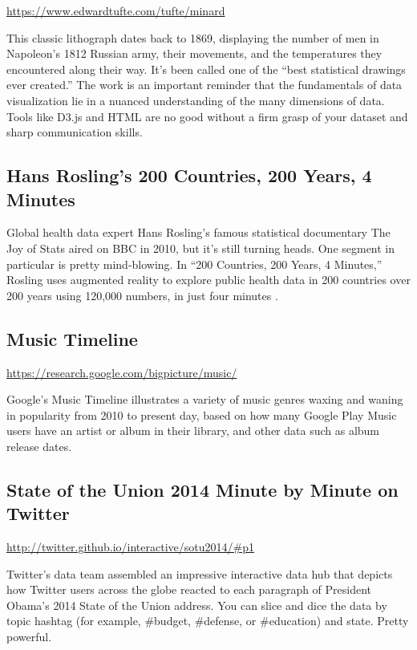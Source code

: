 \documentclass[]{book}
\theoremstyle{definition}
\theoremstyle{definition}
\theoremstyle{definition}
\theoremstyle{remark}
\begin{document}
\url{https://www.edwardtufte.com/tufte/minard}

This classic lithograph dates back to 1869, displaying the number of men
in Napoleon's 1812 Russian army, their movements, and the temperatures
they encountered along their way. It's been called one of the ``best
statistical drawings ever created.'' The work is an important reminder
that the fundamentals of data visualization lie in a nuanced
understanding of the many dimensions of data. Tools like D3.js and HTML
are no good without a firm grasp of your dataset and sharp communication
skills.

\subsection{Hans Rosling's 200 Countries, 200 Years, 4
Minutes}\label{hans-roslings-200-countries-200-years-4-minutes}

Global health data expert Hans Rosling's famous statistical documentary
The Joy of Stats aired on BBC in 2010, but it's still turning heads. One
segment in particular is pretty mind-blowing. In ``200 Countries, 200
Years, 4 Minutes,'' Rosling uses augmented reality to explore public
health data in 200 countries over 200 years using 120,000 numbers, in
just four minutes \citep{hans_rosling}.

\subsection{Music Timeline}\label{music-timeline}

\url{https://research.google.com/bigpicture/music/}

Google's Music Timeline illustrates a variety of music genres waxing and
waning in popularity from 2010 to present day, based on how many Google
Play Music users have an artist or album in their library, and other
data such as album release dates.

\subsection{State of the Union 2014 Minute by Minute on
Twitter}\label{state-of-the-union-2014-minute-by-minute-on-twitter}

\url{http://twitter.github.io/interactive/sotu2014/\#p1}

Twitter's data team assembled an impressive interactive data hub that
depicts how Twitter users across the globe reacted to each paragraph of
President Obama's 2014 State of the Union address. You can slice and
dice the data by topic hashtag (for example, \#budget, \#defense, or
\#education) and state. Pretty powerful.
\end{document}
